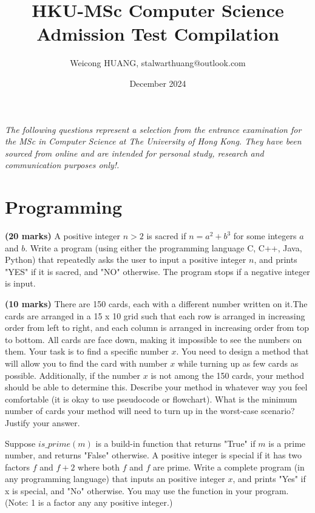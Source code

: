 \documentclass{article}
\title{
HKU-MSc Computer Science
Admission Test Compilation
}
\author{Weicong HUANG, stalwarthuang@outlook.com}
\date{December 2024}
\begin{document}


\maketitle


\vspace{-3.5em} %
\begin{center}
\textit{The following questions represent a selection from the entrance examination for the MSc in Computer Science at The University of Hong Kong. 
They have been sourced from online and are intended for personal study, research and communication purposes only!.}
\end{center}
\vspace{2em} 

\section{Programming}

\noindent\textbf{(20 marks)} A positive integer \(n > 2\) is sacred if \(n = a^2 + b^3\) for some integers \(a\) and \(b\). Write a program (using either the programming language C, C++, Java, Python) that repeatedly asks the user to input a positive integer \(n\), and prints "YES" if it is sacred, and "NO" otherwise. The program stops if a negative integer is input.

\vspace{2\baselineskip} %

\noindent\textbf{(10 marks)} There are 150 cards, each with a different number written on it.The cards are arranged in a 15 x 10 grid such that each row is arranged in increasing order from left to right, and each column is arranged in increasing order from top to bottom. All cards are face down, making it impossible to see the numbers on them. Your task is to find a specific number $x$. You need to design a method that will allow you to find the card with number $x$ while turning up as few cards as possible. Additionally, if the number $x$ is not among the 150 cards, your method should be able to determine this. Describe your method in whatever way you feel comfortable (it is okay to use pseudocode or flowchart). What is the minimum number of cards your method will need to turn up in the worst-case scenario? Justify your answer.

\vspace{2\baselineskip}

\noindent Suppose $is\_prime(m)$ is a build-in function that returns "True" if $m$ is a prime number, and returns "False" otherwise.
A positive integer is special if it has two factors $f$ and $f+2$ where both $f$ and $f$ are prime. Write a complete program (in any programming language) that inputs an positive integer $x$, and prints "Yes" if x is special, and "No" otherwise. You may use the function  in your program. (Note: 1 is a factor any any positive integer.)
\end{document}
